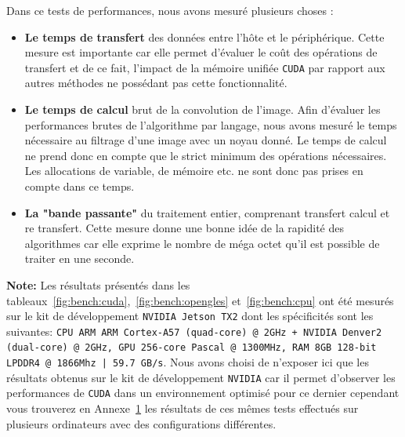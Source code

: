 Dans ce tests de performances, nous avons mesuré plusieurs choses :
\begin{itemize}
\item \textbf{Le temps de transfert} des données entre l'hôte et le périphérique. Cette mesure est importante car elle permet d'évaluer le coût des opérations de transfert et de ce fait, l'impact de la mémoire unifiée \texttt{CUDA} par rapport aux autres méthodes ne possédant pas cette fonctionnalité.
\item \textbf{Le temps de calcul} brut de la convolution de l'image. Afin d'évaluer les performances brutes de l'algorithme par langage, nous avons mesuré le temps nécessaire au filtrage d'une image avec un noyau donné. Le temps de calcul ne prend donc en compte que le strict minimum des opérations nécessaires. Les allocations de variable, de mémoire etc. ne sont donc pas prises en compte dans ce temps.
\item \textbf{La "bande passante"} du traitement entier, comprenant transfert calcul et re transfert. Cette mesure donne une bonne idée de la rapidité des algorithmes car elle exprime le nombre de méga octet qu'il est possible de traiter en une seconde.\\
\end{itemize}

\textbf{Note:} Les résultats présentés dans les tableaux~\ref{fig:bench:cuda},~\ref{fig:bench:opengles} et~\ref{fig:bench:cpu} ont été mesurés sur le kit de développement \texttt{NVIDIA Jetson TX2} dont les spécificités sont les suivantes: \texttt{CPU ARM ARM Cortex-A57 (quad-core) @ 2GHz + NVIDIA Denver2 (dual-core) @ 2GHz, GPU 256-core Pascal @ 1300MHz, RAM 8GB 128-bit LPDDR4 @ 1866Mhz |  59.7 GB/s}. Nous avons choisi de n'exposer ici que les résultats obtenus sur le kit de développement \texttt{NVIDIA} car il permet d'observer les performances de \texttt{CUDA} dans un environnement optimisé pour ce dernier cependant vous trouverez en Annexe~\hyperref[annexe:bench]{1} les résultats de ces mêmes tests effectués sur plusieurs ordinateurs avec des configurations différentes.

